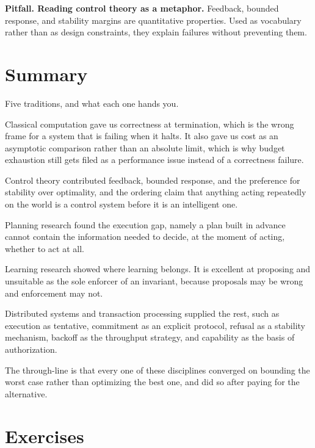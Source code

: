 \textbf{Pitfall. Reading control theory as a metaphor.} Feedback, bounded
response, and stability margins are quantitative properties. Used as vocabulary
rather than as design constraints, they explain failures without preventing them.

\section{Summary}

Five traditions, and what each one hands you.

Classical computation gave us correctness at termination, which is the wrong
frame for a system that is failing when it halts. It also gave us cost as an
asymptotic comparison rather than an absolute limit, which is why budget
exhaustion still gets filed as a performance issue instead of a correctness
failure.

Control theory contributed feedback, bounded response, and the preference for
stability over optimality, and the ordering claim that anything acting
repeatedly on the world is a control system before it is an intelligent one.

Planning research found the execution gap, namely a plan built in advance cannot contain
the information needed to decide, at the moment of acting, whether to act at all.

Learning research showed where learning belongs. It is excellent at proposing and
unsuitable as the sole enforcer of an invariant, because proposals may be wrong
and enforcement may not.

Distributed systems and transaction processing supplied the rest, such as execution as
tentative, commitment as an explicit protocol, refusal as a stability mechanism,
backoff as the throughput strategy, and capability as the basis of authorization.

The through-line is that every one of these disciplines converged on bounding the
worst case rather than optimizing the best one, and did so after paying for the
alternative.

\section*{Exercises}

